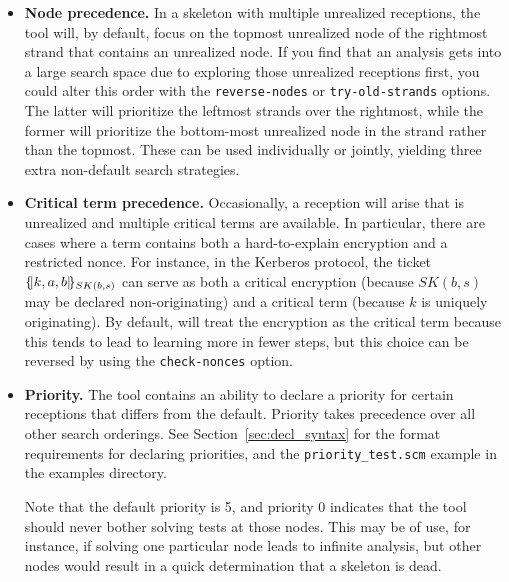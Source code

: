 \begin{itemize}
\item {\bf Node precedence.}  In a skeleton with multiple unrealized
  receptions, the tool will, by default, focus on the topmost
  unrealized node of the rightmost strand that contains an unrealized
  node.  If you find that an analysis gets into a large search space
  due to exploring those unrealized receptions first, you could alter
  this order with the \texttt{reverse-nodes} or
  \texttt{try-old-strands} options.  The latter will prioritize the
  leftmost strands over the rightmost, while the former will
  prioritize the bottom-most unrealized node in the strand rather than
  the topmost. These can be used individually or jointly, yielding
  three extra non-default search strategies.

\item {\bf Critical term precedence.}  Occasionally, a reception will
  arise that is unrealized and multiple critical terms are available.
  In particular, there are cases where a term contains both a
  hard-to-explain encryption and a restricted nonce.  For instance, in
  the Kerberos protocol, the ticket $\{\!|k,a,b|\!\}_{SK(b,s)}$ can serve
  as both a critical encryption (because $SK(b,s)$ may be declared
  non-originating) and a critical term (because $k$ is uniquely
  originating).  By default, {\cpsa} will treat the encryption as the
  critical term because this tends to lead to learning more in fewer
  steps, but this choice can be reversed by using the
  \texttt{check-nonces} option.

\item {\bf Priority.}  The tool contains an ability to declare a
  priority for certain receptions that differs from the default.
  Priority takes precedence over all other search orderings.  See
  Section~\ref{sec:decl_syntax} for the format requirements for
  declaring priorities, and the \texttt{priority\_test.scm} example in the
  examples directory.

  Note that the default priority is 5, and priority 0 indicates that
  the tool should never bother solving tests at those nodes.  This may
  be of use, for instance, if solving one particular node leads to
  infinite analysis, but other nodes would result in a quick
  determination that a skeleton is dead.
\end{itemize}


